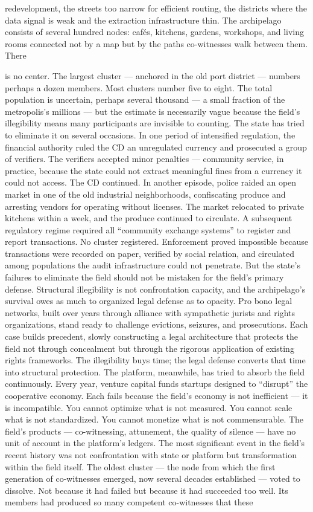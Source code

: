 redevelopment, the streets too narrow for efficient routing, the districts where the data signal is weak and the extraction infrastructure thin. The archipelago consists of several hundred nodes: cafés, kitchens, gardens, workshops, and living rooms connected not by a map but by the paths co-witnesses walk between them. There

is no center. The largest cluster — anchored in the old port district — numbers perhaps a dozen members. Most clusters number five to eight. The total population is uncertain, perhaps several thousand — a small fraction of the metropolis’s millions — but the estimate is necessarily vague because the field’s illegibility means many participants are invisible to counting. The state has tried to eliminate it on several occasions. In one period of intensified regulation, the financial authority ruled the CD an unregulated currency and prosecuted a group of verifiers. The verifiers accepted minor penalties — community service, in practice, because the state could not extract meaningful fines from a currency it could not access. The CD continued. In another episode, police raided an open market in one of the old industrial neighborhoods, confiscating produce and arresting vendors for operating without licenses. The market relocated to private kitchens within a week, and the produce continued to circulate. A subsequent regulatory regime required all “community exchange systems” to register and report transactions. No cluster registered. Enforcement proved impossible because transactions were recorded on paper, verified by social relation, and circulated among populations the audit infrastructure could not penetrate. But the state’s failures to eliminate the field should not be mistaken for the field’s primary defense. Structural illegibility is not confrontation capacity, and the archipelago’s survival owes as much to organized legal defense as to opacity. Pro bono legal networks, built over years through alliance with sympathetic jurists and rights organizations, stand ready to challenge evictions, seizures, and prosecutions. Each case builds precedent, slowly constructing a legal architecture that protects the field not through concealment but through the rigorous application of existing rights frameworks. The illegibility buys time; the legal defense converts that time into structural protection. The platform, meanwhile, has tried to absorb the field continuously. Every year, venture capital funds startups designed to “disrupt” the cooperative economy. Each fails because the field’s economy is not inefficient — it is incompatible. You cannot optimize what is not measured. You cannot scale what is not standardized. You cannot monetize what is not commensurable. The field’s products — co-witnessing, attunement, the quality of silence — have no unit of account in the platform’s ledgers. The most significant event in the field’s recent history was not confrontation with state or platform but transformation within the field itself. The oldest cluster — the node from which the first generation of co-witnesses emerged, now several decades established — voted to dissolve. Not because it had failed but because it had succeeded too well. Its members had produced so many competent co-witnesses that these 